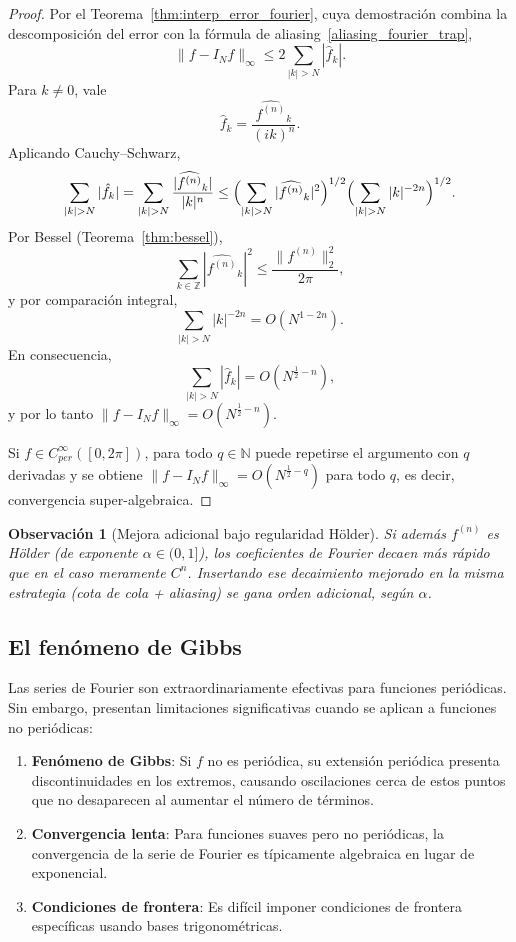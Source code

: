 \documentclass[a4paper,11pt]{report}
\newtheorem{remark}[theorem]{Observación}
\begin{document}
\begin{proof}
Por el Teorema~\ref{thm:interp_error_fourier}, cuya demostración combina la descomposición del error con la fórmula de aliasing~\eqref{aliasing_fourier_trap},
\[
\|f-I_Nf\|_\infty \le 2\sum_{|k|>N}|\hat f_k|.
\]
Para $k\neq 0$, vale
\[
\hat f_k=\frac{\widehat{f^{(n)}}_k}{(ik)^n}.
\]
Aplicando Cauchy--Schwarz,
\[
\sum_{|k|>N}|\hat f_k|
=\sum_{|k|>N}\frac{|\widehat{f^{(n)}}_k|}{|k|^n}
\le
\Bigl(\sum_{|k|>N}|\widehat{f^{(n)}}_k|^2\Bigr)^{1/2}
\Bigl(\sum_{|k|>N}|k|^{-2n}\Bigr)^{1/2}.
\]
Por Bessel (Teorema~\ref{thm:bessel}),
\[
\sum_{k\in\mathbb Z}|\widehat{f^{(n)}}_k|^2\le \frac{\|f^{(n)}\|_2^2}{2\pi},
\]
y por comparación integral,
\[
\sum_{|k|>N}|k|^{-2n}=O(N^{1-2n}).
\]
En consecuencia,
\[
\sum_{|k|>N}|\hat f_k|=O(N^{\frac12-n}),
\]
y por lo tanto $\|f-I_Nf\|_\infty=O(N^{\frac12-n})$.

Si $f\in C^\infty_{per}([0,2\pi])$, para todo $q\in\mathbb N$ puede repetirse el argumento con $q$ derivadas y se obtiene $\|f-I_Nf\|_\infty=O(N^{\frac12-q})$ para todo $q$, es decir, convergencia super-algebraica.
\end{proof}

\begin{remark}[Mejora adicional bajo regularidad Hölder]
Si además $f^{(n)}$ es Hölder (de exponente $\alpha\in(0,1]$), los coeficientes de Fourier decaen más rápido que en el caso meramente $C^n$. Insertando ese decaimiento mejorado en la misma estrategia (cota de cola + aliasing) se gana orden adicional, según $\alpha$.
\end{remark}


\subsection{El fenómeno de Gibbs}

Las series de Fourier son extraordinariamente efectivas para funciones periódicas. Sin embargo, presentan limitaciones significativas cuando se aplican a funciones no periódicas:

\begin{enumerate}
\item \textbf{Fenómeno de Gibbs}: Si $f$ no es periódica, su extensión periódica presenta discontinuidades en los extremos, causando oscilaciones cerca de estos puntos que no desaparecen al aumentar el número de términos.

\item \textbf{Convergencia lenta}: Para funciones suaves pero no periódicas, la convergencia de la serie de Fourier es típicamente algebraica en lugar de exponencial.

\item \textbf{Condiciones de frontera}: Es difícil imponer condiciones de frontera específicas usando bases trigonométricas.
\end{enumerate}
\end{document}
